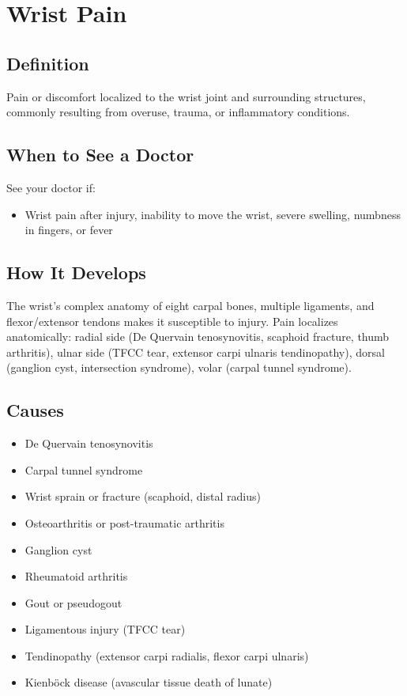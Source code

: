 \chapter{Wrist Pain}

\section*{Definition}
Pain or discomfort localized to the wrist joint and surrounding structures, commonly resulting from overuse, trauma, or inflammatory conditions.

\section*{When to See a Doctor}
See your doctor if:
\begin{itemize}
  \item Wrist pain after injury, inability to move the wrist, severe swelling, numbness in fingers, or fever
\end{itemize}

\section*{How It Develops}
The wrist's complex anatomy of eight carpal bones, multiple ligaments, and flexor/extensor tendons makes it susceptible to injury. Pain localizes anatomically: radial side (De Quervain tenosynovitis, scaphoid fracture, thumb arthritis), ulnar side (TFCC tear, extensor carpi ulnaris tendinopathy), dorsal (ganglion cyst, intersection syndrome), volar (carpal tunnel syndrome).

\section*{Causes}
\begin{itemize}
  \item De Quervain tenosynovitis
  \item Carpal tunnel syndrome
  \item Wrist sprain or fracture (scaphoid, distal radius)
  \item Osteoarthritis or post-traumatic arthritis
  \item Ganglion cyst
  \item Rheumatoid arthritis
  \item Gout or pseudogout
  \item Ligamentous injury (TFCC tear)
  \item Tendinopathy (extensor carpi radialis, flexor carpi ulnaris)
  \item Kienböck disease (avascular tissue death of lunate)
\end{itemize}


